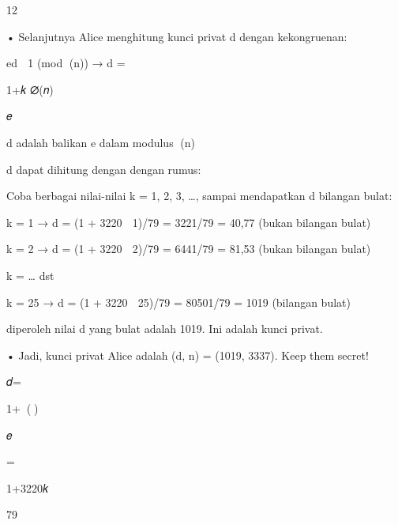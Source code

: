 \documentclass{article}
\begin{document}

12

• Selanjutnya Alice menghitung kunci privat d dengan kekongruenan:


ed  1 (mod (n))   → d =

1+𝑘 ∅(𝑛)

𝑒


 d adalah balikan e dalam modulus (n)

    d dapat dihitung dengan dengan rumus:


    Coba  berbagai nilai-nilai k = 1, 2, 3, …, sampai mendapatkan d bilangan bulat: 


k = 1 → d = (1 + 3220  1)/79 = 3221/79 = 40,77    (bukan bilangan bulat)


k = 2 → d = (1 + 3220  2)/79 = 6441/79 = 81,53    (bukan bilangan bulat)


k = … dst


k = 25 → d = (1 + 3220  25)/79 = 80501/79 = 1019    (bilangan bulat)

   diperoleh nilai d yang bulat adalah 1019. Ini adalah kunci privat. 

• Jadi, kunci privat Alice adalah (d, n) = (1019, 3337). Keep them secret!

𝑑=

1+𝑘(𝑛)

𝑒

 = 

1+3220𝑘

79
\end{document}
